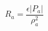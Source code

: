 \documentclass[12pt]{article}
\begin{document}
$$
  R_a = \frac{\epsilon \left| P_a \right|}{\rho_a^2}
$$  
\end{document}
